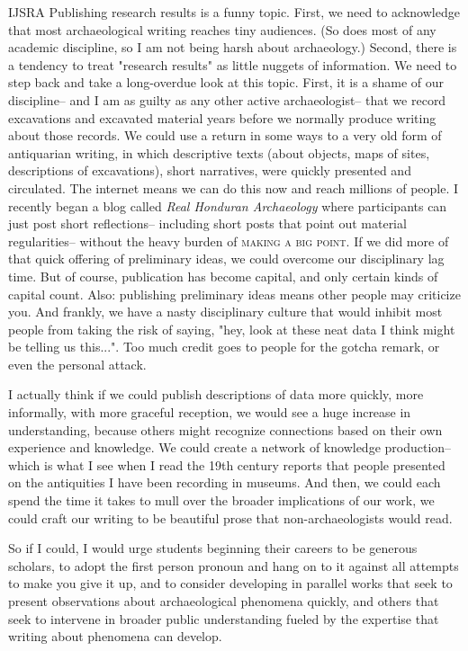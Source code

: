 \begin{labeling}{IJSRA}
Publishing research results is a funny topic. First, we need to acknowledge that most archaeological writing reaches tiny audiences. (So does most of any academic discipline, so I am not being harsh about archaeology.) Second, there is a tendency to treat "research results" as little nuggets of information. We need to step back and take a long-overdue look at this topic. First, it is a shame of our discipline-- and I am as guilty as any other active archaeologist-- that we record excavations and excavated material years before we normally produce writing about those records. We could use a return in some ways to a very old form of antiquarian writing, in which descriptive texts (about objects, maps of sites, descriptions of excavations), short narratives, were quickly presented and circulated. The internet means we can do this now and reach millions of people. I recently began a blog called \textit{Real Honduran Archaeology} where participants can just post short reflections-- including short posts that point out material regularities-- without the heavy burden of {\scshape making a big point}. 
If we did more of that quick offering of preliminary ideas, we could overcome our disciplinary lag time. But of course, publication has become capital, and only certain kinds of capital count. Also: publishing preliminary ideas means other people may criticize you. And frankly, we have a nasty disciplinary culture that would inhibit most people from taking the risk of saying, "hey, look at these neat data I think might be telling us this...". Too much credit goes to people for the gotcha remark, or even the personal attack. 


I actually think if we could publish descriptions of data more quickly, more informally, with more graceful reception, we would see a huge increase in understanding, because others might recognize connections based on their own experience and knowledge. We could create a network of knowledge production-- which is what I see when I read the 19th century reports that people presented on the antiquities I have been recording in museums. And then, we could each spend the time it takes to mull over the broader implications of our work, we could craft our writing to be beautiful prose that non-archaeologists would read.

So if I could, I would urge students beginning their careers to be generous scholars, to adopt the first person pronoun and hang on to it against all attempts to make you give it up, and to consider developing in parallel works that seek to present observations about archaeological phenomena quickly, and others that seek to intervene in broader public understanding fueled by the expertise that writing about phenomena can develop.



\end{labeling}
